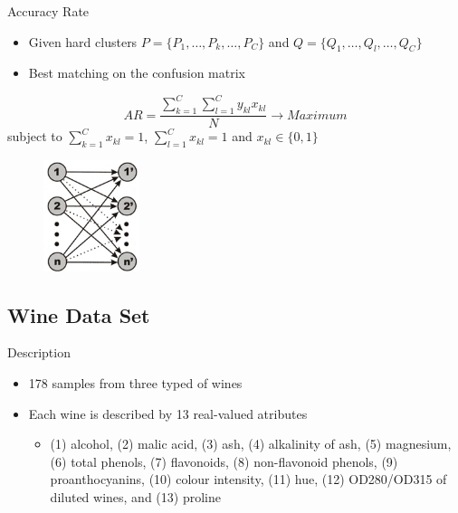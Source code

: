 \documentclass{beamer}
\begin{document}
\begin{frame}{Accuracy Rate}
	\begin{itemize}
		\item{Given hard clusters $P=\{P_{1},\ldots,P_{k},\ldots,P_{C}\}$ and $Q=\{Q_{1},\ldots,Q_{l},\ldots,Q_{C}\}$}
		\item{Best matching on the confusion matrix}
	\end{itemize}
	\begin{displaymath}
		AR=\frac{\sum_{k=1}^{C}\sum_{l=1}^{C}{y_{kl}}{x_{kl}}}{N} \rightarrow Maximum
	\end{displaymath}
	\pause
	subject to $\sum_{k=1}^{C}x_{kl}=1$, $\sum_{l=1}^{C}x_{kl}=1$ and $x_{kl} \in \{0,1\}$
	\pause
	\begin{figure}
		\centering
		\includegraphics[width=0.25\textwidth]{image/graph.jpg}
	\end{figure}
\end{frame}

\subsection{Wine Data Set}

\begin{frame}{Description}
	\begin{itemize}
		\item{178 samples from three typed of wines}
		\item{Each wine is described by 13 real-valued atributes}
		\begin{itemize}
			\item{(1) alcohol, (2) malic acid, (3) ash, (4) alkalinity of ash, (5) magnesium, (6) total phenols, (7) flavonoids, (8) non-flavonoid phenols, (9) proanthocyanins, (10) colour intensity, (11) hue, (12) OD280/OD315 of diluted wines, and (13) proline}
		\end{itemize}
	\end{itemize}
\end{frame}
\end{document}
